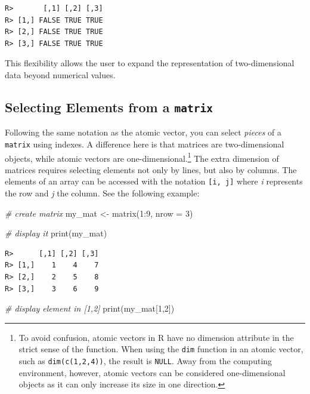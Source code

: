 \documentclass[
  12pt,
]{book}
\newenvironment{Shaded}{\begin{snugshade}}{\end{snugshade}}
\newcommand{\AttributeTok}[1]{\textcolor[rgb]{0.61,0.61,0.61}{#1}}
\newcommand{\CommentTok}[1]{\textcolor[rgb]{0.37,0.37,0.37}{\textit{#1}}}
\newcommand{\DecValTok}[1]{\textcolor[rgb]{0.06,0.06,0.06}{#1}}
\newcommand{\FunctionTok}[1]{\textcolor[rgb]{0,0,0}{#1}}
\newcommand{\NormalTok}[1]{#1}
\newcommand{\OtherTok}[1]{\textcolor[rgb]{0.37,0.37,0.37}{#1}}
\newcommand{\SpecialCharTok}[1]{\textcolor[rgb]{0,0,0}{#1}}
\begin{document}
\begin{verbatim}
R>       [,1] [,2] [,3]
R> [1,] FALSE TRUE TRUE
R> [2,] FALSE TRUE TRUE
R> [3,] FALSE TRUE TRUE
\end{verbatim}

This flexibility allows the user to expand the representation of two-dimensional data beyond numerical values.

\hypertarget{selecting-elements-from-a-matrix}{%
\subsection{\texorpdfstring{Selecting Elements from a \texttt{matrix}}{Selecting Elements from a matrix}}\label{selecting-elements-from-a-matrix}}

Following the same notation as the atomic vector, you can select \emph{pieces} of a \texttt{matrix} using indexes. A difference here is that matrices are two-dimensional objects, while atomic vectors are one-dimensional.\footnote{To avoid confusion, atomic vectors in R have no dimension attribute in the strict sense of the function. When using the \texttt{dim} function in an atomic vector, such as \texttt{dim(c(1,2,4))}, the result is \texttt{NULL}. Away from the computing environment, however, atomic vectors can be considered one-dimensional objects as it can only increase its size in one direction.} The extra dimension of matrices requires selecting elements not only by lines, but also by columns. The elements of an array can be accessed with the notation \texttt{{[}i,\ j{]}} where \emph{i} represents the row and \emph{j} the column. See the following example:

\begin{Shaded}
\begin{Highlighting}[]
\CommentTok{\# create matrix}
\NormalTok{my\_mat }\OtherTok{\textless{}{-}} \FunctionTok{matrix}\NormalTok{(}\DecValTok{1}\SpecialCharTok{:}\DecValTok{9}\NormalTok{, }\AttributeTok{nrow =} \DecValTok{3}\NormalTok{)}

\CommentTok{\# display it}
\FunctionTok{print}\NormalTok{(my\_mat)}
\end{Highlighting}
\end{Shaded}

\begin{verbatim}
R>      [,1] [,2] [,3]
R> [1,]    1    4    7
R> [2,]    2    5    8
R> [3,]    3    6    9
\end{verbatim}

\begin{Shaded}
\begin{Highlighting}[]
\CommentTok{\# display element in [1,2]}
\FunctionTok{print}\NormalTok{(my\_mat[}\DecValTok{1}\NormalTok{,}\DecValTok{2}\NormalTok{])}
\end{Highlighting}
\end{Shaded}
\end{document}
